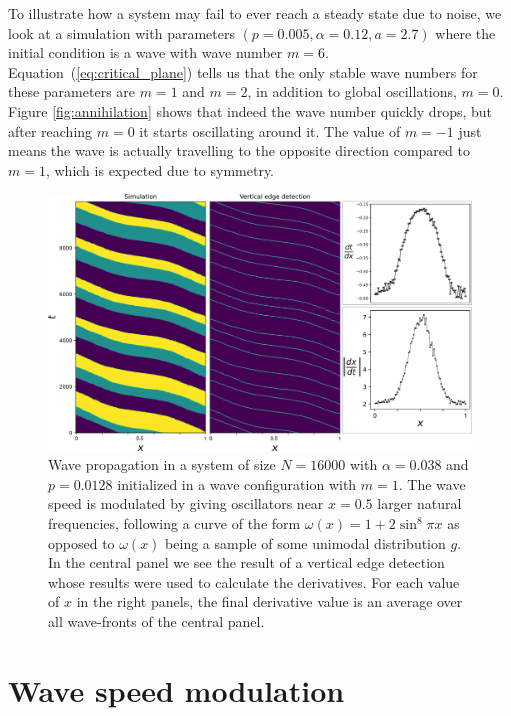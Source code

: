 To illustrate how a system may fail to ever reach a steady state due to noise, we look at a simulation with parameters $(p=0.005,
\alpha=0.12, a=2.7)$ where the initial condition is a wave with wave number $m=6$. Equation~(\ref{eq:critical_plane}) tells us that the
only stable wave numbers for these parameters are $m=1$ and $m=2$, in addition to global oscillations, $m=0$. Figure
\ref{fig:annihilation} shows that indeed the wave number quickly drops, but after reaching $m=0$ it starts oscillating around it. The
value of $m=-1$ just means the wave is actually travelling to the opposite direction compared to $m=1$, which is expected due to
symmetry.

\begin{figure}
  \centering
  \includegraphics[width=\textwidth]{fig/chap4/speed_modulation.png}
  \caption{
		Wave propagation in a system of size $N=16000$ with $\alpha=0.038$ and $p=0.0128$ initialized in a wave configuration with $m=1$.
		The wave speed is modulated by giving oscillators near $x=0.5$ larger natural frequencies, following a curve of the form $\omega(x)
		= 1 + 2\sin^8 \pi x$ as opposed to $\omega(x)$ being a sample of some unimodal distribution $g$. In the central panel we see the
		result of a vertical edge detection whose results were used to calculate the derivatives. For each value of $x$ in the right
		panels, the final derivative value is an average over all wave-fronts of the central panel.
  }
  \label{fig:speedmodulation}
\end{figure}

\section{Wave speed modulation}

